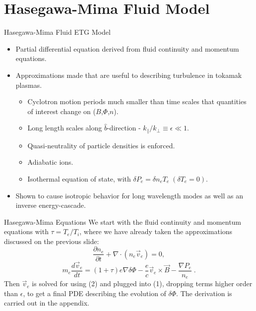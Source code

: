 \documentclass[aspectratio=43]{beamer}
\begin{document}
   \section{Hasegawa-Mima Fluid Model}

   \begin{frame}{Hasegawa-Mima Fluid ETG Model}
      \begin{itemize}
         \item Partial differential equation derived from fluid continuity and momentum equations.
         \item Approximations made that are useful to describing  turbulence in tokamak plasmas.
         \begin{itemize}
            \item Cyclotron motion periods much smaller than time scales that quantities of interest change on ($B$,$\Phi$,$n$).
            \item Long length scales along $\hat{b}$-direction - $k_{\parallel}/k_{\perp}\equiv\epsilon\ll1$.
            \item Quasi-neutrality of particle densities is enforced.
            \item Adiabatic ions.
            \item Isothermal equation of state, with $\delta P_e = \delta n_eT_e\;(\delta T_e=0)$.
         \end{itemize}
         \item Shown to cause isotropic behavior for long wavelength modes as well as an inverse energy-cascade.
      \end{itemize}
   \end{frame}

   \begin{frame}{Hasegawa-Mima Equations}
      \quad We start with the fluid continuity and momentum equations with $\tau = T_e/T_i$, where we have already taken the approximations discussed
   on the previous slide:
      \begin{equation}
         \frac{\partial n_e}{\partial t} + \nabla\cdot\left(n_e\vec{v}_e\right) = 0,
      \end{equation}
      \begin{equation}
            m_e\frac{d\vec{v}_e}{dt} = \left(1+\tau\right)e\nabla\delta\Phi - \frac{e}{c}\vec{v}_e\times\vec{B}-\frac{\nabla P_e}{n_e}\;.
      \end{equation}
      \quad Then $\vec{v}_e$ is solved for using (2) and plugged into (1), dropping terms higher order than $\epsilon$,
      to get a final PDE describing the evolution of $\delta\Phi$. The derivation is carried out in the appendix.
   \end{frame}
\end{document}
